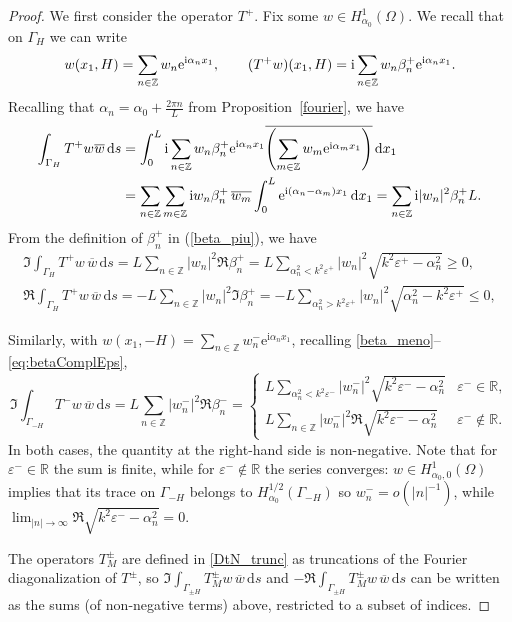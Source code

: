 \documentclass[a4paper,10pt]{article}
\newcommand{\IR}{{\mathbb R}}
\newcommand{\IZ}{{\mathbb Z}}
\newcommand{\ri}{{\mathrm i}}
\newcommand{\re}{{\mathrm e}}
\newcommand{\rd}{{\,\mathrm d}}
\newcommand{\cw}{{\overline{w}}}
\newcommand{\GH}{{\Gamma_H}}
\newcommand{\GmH}{{\Gamma_{-H}}}
\newcommand{\GpmH}{{\Gamma_{\pm H}}}
\begin{document}
\begin{proof}
We first consider the operator $T^+$. Fix some $w\in H^1_{\alpha_0} (\Omega)$.
We recall that on $\GH$ we can write
\begin{equation*}
	w(x_1,H) = \sum_{n \in \mathbb{Z}} w_n \re^{\ri \alpha_n x_1}, \hspace{0.7cm} 
	(T^+ w)(x_1,H) = \ri \sum_{n\in\mathbb{Z}} w_n \beta_n^+ \re^{\ri\alpha_n x_1}.
\end{equation*}
Recalling that $\alpha_n=\alpha_0+\frac{2\pi n}L$ from Proposition~\ref{fourier}, we have
\begin{align*}
	\int_\GH T^+ w \hspace{0.01cm} \cw \rd s & 
	= \int_{0}^{L} \ri \sum_{n\in\mathbb{Z}} w_n \beta_n^+ \re^{\ri\alpha_nx_1} \overline{\left( \sum_{m \in \mathbb{Z}} w_m \re^{\ri \alpha_m x_1} \right)} \rd x_1 \\
	& = \sum_{n\in\mathbb{Z}} \sum_{m \in \mathbb{Z}} \ri w_n \beta_n^+ \, \overline{w_m} \int_{0}^{L} \re^{\ri(\alpha_n-\alpha_m) x_1} \rd x_1 
	= \sum_{n\in\mathbb{Z}} \ri |w_n|^2 \beta_n^+ L.
\end{align*}
From the definition of $\beta_n^+$ in (\ref{beta_piu}), we have
\begin{align*}
	\Im \int_\GH T^+ w \, \cw\rd s 
	= L \sum_{n\in\mathbb{Z}}  |w_n|^2 \Re\beta_n^+
	= L\sum_{\alpha^2_n < k^2\varepsilon^+} |w_n|^2 \sqrt{k^2\varepsilon^+-\alpha_n^2} \geq 0, \\
	\Re \int_\GH T^+ w \, \cw\rd s 
	= -L \sum_{n\in\mathbb{Z}}  |w_n|^2 \Im\beta_n^+
	= -L\sum_{\alpha^2_n > k^2\varepsilon^+} |w_n|^2 \sqrt{\alpha_n^2-k^2\varepsilon^+} \leq 0,
\end{align*}

Similarly, with $w(x_1,-H) = \sum_{n \in \mathbb{Z}} w_n^- \re^{\ri \alpha_n x_1}$, recalling \eqref{beta_meno}--\eqref{eq:betaComplEps},
$$
\Im \int_\GmH T^- w \, \cw \rd s 
=L \sum_{n\in\mathbb{Z}}  |w_n^-|^2 \Re\beta_n^-
=\begin{cases}\displaystyle
	L\sum_{\alpha^2_n < k^2\varepsilon^-} |w_n^-|^2 \sqrt{k^2\varepsilon^- -\alpha_n^2} 
	& \varepsilon^-\in\IR,\\[2mm]
	\displaystyle
	L\sum_{n\in\IZ}|w_n^-|^2 \Re\sqrt{k^2\varepsilon^- -\alpha_n^2} 
	& \varepsilon^-\notin\IR.
\end{cases}
$$
In both cases, the quantity at the right-hand side is non-negative.
Note that for $\varepsilon^-\in\IR$ the sum is finite, while for $\varepsilon^-\notin\IR$ the series converges: $w\in H^1_{\alpha_0,0}(\Omega)$ implies that its trace on $\GmH$ belongs to $H^{1/2}_{\alpha_0}(\GmH)$ so $w_n^-=o(|n|^{-1})$, while $\lim_{|n|\to\infty} \Re\sqrt{k^2\varepsilon^- -\alpha_n^2} =0$.

The operators $T^\pm_M$ are defined in \eqref{DtN_trunc} as truncations of the Fourier diagonalization of $T^\pm$, so 
$\Im \int_\GpmH T^\pm_M w \,\cw\rd s$ and $-\Re\int_\GpmH T^\pm_M w \,\cw\rd s$ can be written as the sums (of non-negative terms) above, restricted to a subset of indices.
\end{proof}
\end{document}
